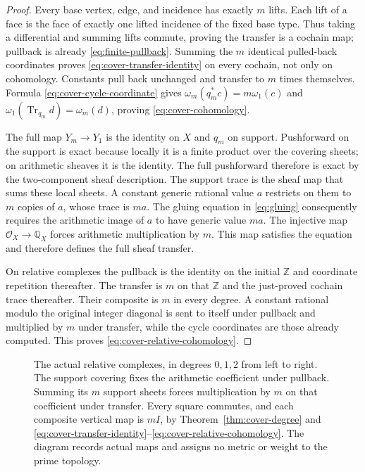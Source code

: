 \documentclass[11pt,a4paper]{article}
\theoremstyle{definition}\newtheorem{definition}[theorem]{Definition}
\newcommand{\Z}{\mathbb Z}\newcommand{\Q}{\mathbb Q}
\begin{document}
\begin{proof}
Every base vertex, edge, and incidence has exactly $m$ lifts. Each
lift of a face is the face of exactly one lifted incidence of the
fixed base type. Thus taking a differential and summing lifts commute,
proving the transfer is a cochain map; pullback is already
\eqref{eq:finite-pullback}. Summing the $m$ identical pulled-back
coordinates proves \eqref{eq:cover-transfer-identity} on every
cochain, not only on cohomology. Constants pull back unchanged and
transfer to $m$ times themselves. Formula
\eqref{eq:cover-cycle-coordinate} gives
$\omega_m(q_m^*c)=m\omega_1(c)$ and
$\omega_1(\operatorname{Tr}_{q_m}d)=\omega_m(d)$, proving
\eqref{eq:cover-cohomology}.

The full map $Y_m\to Y_1$ is the identity on $X$ and $q_m$ on
support. Pushforward on the support is exact because locally it is
a finite product over the covering sheets; on arithmetic sheaves
it is the identity. The full pushforward therefore is exact by the
two-component sheaf description. The support trace is the sheaf
map that sums these local sheets. A constant generic rational value
$a$ restricts on them to $m$ copies of $a$, whose trace is $ma$.
The gluing equation in \eqref{eq:gluing} consequently requires the
arithmetic image of $a$ to have generic value $ma$. The injective
map $\mathcal O_X\to\Q_X$ forces arithmetic multiplication by $m$.
This map satisfies the equation and therefore defines the full
sheaf transfer.

On relative complexes the pullback is the identity on the initial
$\Z$ and coordinate repetition thereafter. The transfer is $m$ on
that $\Z$ and the just-proved cochain trace thereafter. Their composite
is $m$ in every degree. A constant rational modulo the original
integer diagonal is sent to itself under pullback and multiplied
by $m$ under transfer, while the cycle coordinates are those already
computed. This proves \eqref{eq:cover-relative-cohomology}.
\end{proof}

\begin{figure}[ht]
\centering
{}
\caption{The actual relative complexes, in degrees $0,1,2$ from
left to right. The support covering fixes the arithmetic coefficient
under pullback. Summing its $m$ support sheets forces multiplication
by $m$ on that coefficient under transfer. Every square commutes,
and each composite vertical map is $mI$, by
Theorem~\ref{thm:cover-degree} and
\eqref{eq:cover-transfer-identity}--\eqref{eq:cover-relative-cohomology}.
The diagram records actual maps and assigns no metric or weight to
the prime topology.}
\end{figure}
\end{document}
